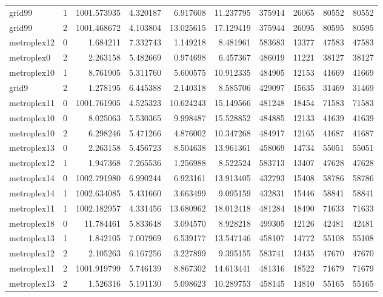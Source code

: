 \begin{longtable}{|l|r|r|r|r|r|r|r|r|r|}
grid99 & 1 & 1001.573935 & 4.320187 & 6.917608 & 11.237795 & 375914 & 26065 & 80552 & 80552 \\
grid99 & 2 & 1001.468672 & 4.103804 & 13.025615 & 17.129419 & 375944 & 26095 & 80595 & 80595 \\
metroplex12 & 0 & 1.684211 & 7.332743 & 1.149218 & 8.481961 & 583683 & 13377 & 47583 & 47583 \\
metroplex0 & 2 & 2.263158 & 5.482669 & 0.974698 & 6.457367 & 486019 & 11221 & 38127 & 38127 \\
metroplex10 & 1 & 8.761905 & 5.311760 & 5.600575 & 10.912335 & 484905 & 12153 & 41669 & 41669 \\
grid9 & 2 & 1.278195 & 6.445388 & 2.140318 & 8.585706 & 429097 & 15635 & 31469 & 31469 \\
metroplex11 & 0 & 1001.761905 & 4.525323 & 10.624243 & 15.149566 & 481248 & 18454 & 71583 & 71583 \\
metroplex10 & 0 & 8.025063 & 5.530365 & 9.998487 & 15.528852 & 484885 & 12133 & 41639 & 41639 \\
metroplex10 & 2 & 6.298246 & 5.471266 & 4.876002 & 10.347268 & 484917 & 12165 & 41687 & 41687 \\
metroplex13 & 0 & 2.263158 & 5.456723 & 8.504638 & 13.961361 & 458069 & 14734 & 55051 & 55051 \\
metroplex12 & 1 & 1.947368 & 7.265536 & 1.256988 & 8.522524 & 583713 & 13407 & 47628 & 47628 \\
metroplex14 & 0 & 1002.791980 & 6.990244 & 6.923161 & 13.913405 & 432793 & 15408 & 58786 & 58786 \\
metroplex14 & 1 & 1002.634085 & 5.431660 & 3.663499 & 9.095159 & 432831 & 15446 & 58841 & 58841 \\
metroplex11 & 1 & 1002.182957 & 4.331456 & 13.680962 & 18.012418 & 481284 & 18490 & 71633 & 71633 \\
metroplex18 & 0 & 11.784461 & 5.833648 & 3.094570 & 8.928218 & 499305 & 12126 & 42481 & 42481 \\
metroplex13 & 1 & 1.842105 & 7.007969 & 6.539177 & 13.547146 & 458107 & 14772 & 55108 & 55108 \\
metroplex12 & 2 & 2.105263 & 6.167256 & 3.227899 & 9.395155 & 583741 & 13435 & 47670 & 47670 \\
metroplex11 & 2 & 1001.919799 & 5.746139 & 8.867302 & 14.613441 & 481316 & 18522 & 71679 & 71679 \\
metroplex13 & 2 & 1.526316 & 5.191130 & 5.098623 & 10.289753 & 458145 & 14810 & 55165 & 55165 \\

\end{longtable}
